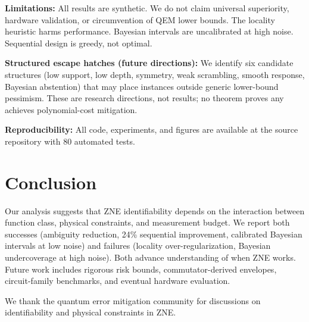\documentclass[aps,pra,twocolumn,superscriptaddress]{revtex4-2}
\begin{document}
\textbf{Limitations:}
All results are synthetic.
We do not claim universal superiority, hardware validation, or circumvention of QEM lower bounds.
The locality heuristic harms performance.
Bayesian intervals are uncalibrated at high noise.
Sequential design is greedy, not optimal.

\textbf{Structured escape hatches (future directions):}
We identify six candidate structures (low support, low depth, symmetry, weak scrambling, smooth response, Bayesian abstention) that may place instances outside generic lower-bound pessimism.
These are research directions, not results; no theorem proves any achieves polynomial-cost mitigation.

\textbf{Reproducibility:}
All code, experiments, and figures are available at the source repository with 80 automated tests.

\section{Conclusion}
\label{sec:conclusion}

Our analysis suggests that ZNE identifiability depends on the interaction between function class, physical constraints, and measurement budget.
We report both successes (ambiguity reduction, 24\% sequential improvement, calibrated Bayesian intervals at low noise) and failures (locality over-regularization, Bayesian undercoverage at high noise).
Both advance understanding of when ZNE works.
Future work includes rigorous risk bounds, commutator-derived envelopes, circuit-family benchmarks, and eventual hardware evaluation.

\begin{acknowledgments}
We thank the quantum error mitigation community for discussions on identifiability and physical constraints in ZNE.
\end{acknowledgments}


\end{document}
